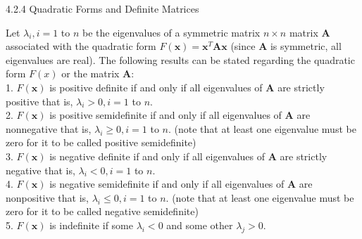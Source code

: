\documentclass[aspectratio=169,xcolor=dvipsnames]{beamer}
\begin{document}
\begin{frame}{4.2.4 Quadratic Forms and Definite Matrices}

\begin{theorem}
    Let $\lambda_i, i = 1$ to $n$ be the eigenvalues of a symmetric matrix $n \times n$ matrix $\mathbf{A}$ associated with the quadratic form $F(\mathbf{x}) = \mathbf{x}^T \mathbf{A} \mathbf{x}$ (since $\mathbf{A}$ is symmetric, all eigenvalues are real).
    The following results can be stated regarding the quadratic form $F(x)$ or the matrix $\mathbf{A}$: \\
    1. $F(\mathbf{x})$ is positive definite if and only if all eigenvalues of $\mathbf{A}$ are strictly positive that is, $\lambda_i > 0, i = 1$ to $n$. \\
    2. $F(\mathbf{x})$ is positive semidefinite if and only if all eigenvalues of $\mathbf{A}$ are nonnegative that is, $\lambda_i \geq 0, i = 1$ to $n$. (note that at least one eigenvalue must be zero for it to be called positive semidefinite) \\
    3. $F(\mathbf{x})$ is negative definite if and only if all eigenvalues of $\mathbf{A}$ are strictly negative that is, $\lambda_i < 0, i = 1$ to $n$. \\
    4. $F(\mathbf{x})$ is negative semidefinite if and only if all eigenvalues of $\mathbf{A}$ are nonpositive that is, $\lambda_i \leq 0, i = 1$ to $n$. (note that at least one eigenvalue must be zero for it to be called negative semidefinite) \\
    5. $F(\mathbf{x})$ is indefinite if some $\lambda_i < 0$ and some other $\lambda_j > 0$.
\end{theorem}

\end{frame}
\end{document}
